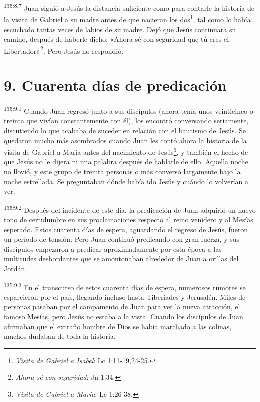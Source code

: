 \par 
\textsuperscript{135:8.7} Juan siguió a Jesús la distancia suficiente como para contarle la historia de la visita de Gabriel a su madre antes de que nacieran los dos\footnote{\textit{Visita de Gabriel a Isabel}: Lc 1:11-19,24-25.}, tal como lo había escuchado tantas veces de labios de su madre. Dejó que Jesús continuara su camino, después de haberle dicho: «Ahora sé con seguridad que tú eres el Libertador»\footnote{\textit{Ahora sé con seguridad}: Jn 1:34.}. Pero Jesús no respondió.

\section*{9. Cuarenta días de predicación}
\par 
\textsuperscript{135:9.1} Cuando Juan regresó junto a sus discípulos (ahora tenía unos veinticinco o treinta que vivían constantemente con él), los encontró conversando seriamente, discutiendo lo que acababa de suceder en relación con el bautismo de Jesús. Se quedaron mucho más asombrados cuando Juan les contó ahora la historia de la visita de Gabriel a María antes del nacimiento de Jesús\footnote{\textit{Visita de Gabriel a María}: Lc 1:26-38.}, y también el hecho de que Jesús no le dijera ni una palabra después de hablarle de ello. Aquella noche no llovió, y este grupo de treinta personas o más conversó largamente bajo la noche estrellada. Se preguntaban dónde había ido Jesús y cuándo lo volverían a ver.

\par 
\textsuperscript{135:9.2} Después del incidente de este día, la predicación de Juan adquirió un nuevo tono de certidumbre en sus proclamaciones respecto al reino venidero y al Mesías esperado. Estos cuarenta días de espera, aguardando el regreso de Jesús, fueron un período de tensión. Pero Juan continuó predicando con gran fuerza, y sus discípulos empezaron a predicar aproximadamente por esta época a las multitudes desbordantes que se amontonaban alrededor de Juan a orillas del Jordán.

\par 
\textsuperscript{135:9.3} En el transcurso de estos cuarenta días de espera, numerosos rumores se esparcieron por el país, llegando incluso hasta Tiberiades y Jerusalén. Miles de personas pasaban por el campamento de Juan para ver la nueva atracción, el famoso Mesías, pero Jesús no estaba a la vista. Cuando los discípulos de Juan afirmaban que el extraño hombre de Dios se había marchado a las colinas, muchos dudaban de toda la historia.

